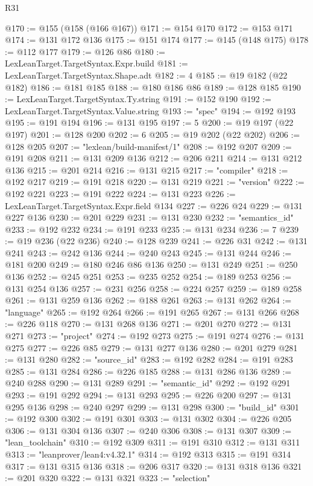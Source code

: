 \begin{lexlean}{R31}
\begin{coremodule}
@170 := @155 (@158 (@166 @167))
@171 := @154 @170
@172 := @153 @171
@174 := @131 @172 @136
@175 := @151 @174
@177 := @145 (@148 @175)
@178 := @112 @177
@179 := @126 @86
@180 := LexLeanTarget.TargetSyntax.Expr.build
@181 := LexLeanTarget.TargetSyntax.Shape.adt
@182 := 4
@185 := @19 @182 (@22 @182)
@186 := @181 @185
@188 := @180 @186 @86
@189 := @128 @185
@190 := LexLeanTarget.TargetSyntax.Ty.string
@191 := @152 @190
@192 := LexLeanTarget.TargetSyntax.Value.string
@193 := "spec"
@194 := @192 @193
@195 := @191 @194
@196 := @131 @195
@197 := 5
@200 := @19 @197 (@22 @197)
@201 := @128 @200
@202 := 6
@205 := @19 @202 (@22 @202)
@206 := @128 @205
@207 := "lexlean/build-manifest/1"
@208 := @192 @207
@209 := @191 @208
@211 := @131 @209 @136
@212 := @206 @211
@214 := @131 @212 @136
@215 := @201 @214
@216 := @131 @215
@217 := "compiler"
@218 := @192 @217
@219 := @191 @218
@220 := @131 @219
@221 := "version"
@222 := @192 @221
@223 := @191 @222
@224 := @131 @223
@226 := LexLeanTarget.TargetSyntax.Expr.field @134
@227 := @226 @24
@229 := @131 @227 @136
@230 := @201 @229
@231 := @131 @230
@232 := "semantics_id"
@233 := @192 @232
@234 := @191 @233
@235 := @131 @234
@236 := 7
@239 := @19 @236 (@22 @236)
@240 := @128 @239
@241 := @226 @31
@242 := @131 @241
@243 := @242 @136
@244 := @240 @243
@245 := @131 @244
@246 := @181 @200
@249 := @180 @246 @86 @136
@250 := @131 @249
@251 := @250 @136
@252 := @245 @251
@253 := @235 @252
@254 := @189 @253
@256 := @131 @254 @136
@257 := @231 @256
@258 := @224 @257
@259 := @189 @258
@261 := @131 @259 @136
@262 := @188 @261
@263 := @131 @262
@264 := "language"
@265 := @192 @264
@266 := @191 @265
@267 := @131 @266
@268 := @226 @118
@270 := @131 @268 @136
@271 := @201 @270
@272 := @131 @271
@273 := "project"
@274 := @192 @273
@275 := @191 @274
@276 := @131 @275
@277 := @226 @85
@279 := @131 @277 @136
@280 := @201 @279
@281 := @131 @280
@282 := "source_id"
@283 := @192 @282
@284 := @191 @283
@285 := @131 @284
@286 := @226 @185
@288 := @131 @286 @136
@289 := @240 @288
@290 := @131 @289
@291 := "semantic_id"
@292 := @192 @291
@293 := @191 @292
@294 := @131 @293
@295 := @226 @200
@297 := @131 @295 @136
@298 := @240 @297
@299 := @131 @298
@300 := "build_id"
@301 := @192 @300
@302 := @191 @301
@303 := @131 @302
@304 := @226 @205
@306 := @131 @304 @136
@307 := @240 @306
@308 := @131 @307
@309 := "lean_toolchain"
@310 := @192 @309
@311 := @191 @310
@312 := @131 @311
@313 := "leanprover/lean4:v4.32.1"
@314 := @192 @313
@315 := @191 @314
@317 := @131 @315 @136
@318 := @206 @317
@320 := @131 @318 @136
@321 := @201 @320
@322 := @131 @321
@323 := "selection"

\end{coremodule}
\end{lexlean}
